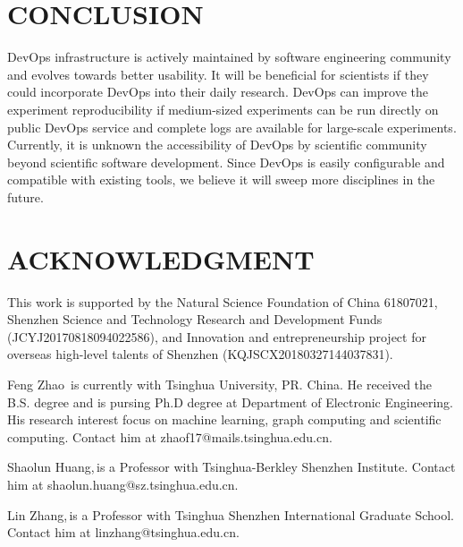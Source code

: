 \documentclass{IEEEcsmag}
\begin{document}


\section{CONCLUSION}
DevOps infrastructure is actively maintained by software engineering community and evolves towards better usability. It will be beneficial for scientists if they could incorporate DevOps into their daily research. DevOps can improve the experiment reproducibility if medium-sized experiments can be run directly on public DevOps service and complete logs are available for large-scale experiments. Currently, it is unknown the accessibility of DevOps by scientific community beyond scientific software development. Since DevOps is easily configurable and compatible with existing tools, we believe it will sweep more disciplines in the future.

\section{ACKNOWLEDGMENT}

This work is supported by the Natural Science Foundation of China 61807021, Shenzhen Science and Technology Research and Development Funds (JCYJ20170818094022586), and Innovation and entrepreneurship project for overseas high-level talents of Shenzhen (KQJSCX20180327144037831).







\begin{IEEEbiography}{Feng Zhao}{\,} is
currently with Tsinghua University, PR. China. He received the B.S. degree and is pursing Ph.D degree at Department of Electronic Engineering. His research interest focus on machine learning, graph computing and scientific computing. Contact him at zhaof17@mails.tsinghua.edu.cn.
\end{IEEEbiography}

\begin{IEEEbiography}{Shaolun Huang,}{\,}is a Professor with Tsinghua-Berkley Shenzhen Institute. Contact him at shaolun.huang@sz.tsinghua.edu.cn.
\end{IEEEbiography}

\begin{IEEEbiography}{Lin Zhang,}{\,}is a Professor with Tsinghua Shenzhen International Graduate School. Contact him at linzhang@tsinghua.edu.cn.
\end{IEEEbiography}
\end{document}
